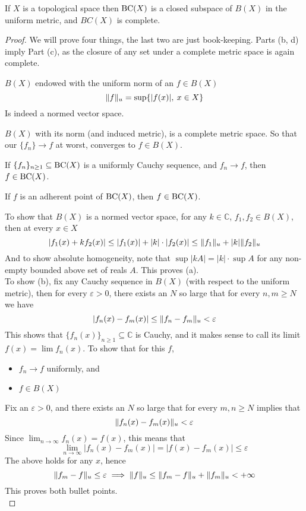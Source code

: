 \documentclass[../../main.tex]{subfiles}
\begin{document}
\begin{wts}
If $X$ is a topological space then $\operatorname{BC}({X})$ is a closed subspace of $B(X)$ in the uniform metric, and $BC(X)$ is complete.
\end{wts}
\begin{proof}
We will prove four things, the last two are just book-keeping. Parts (b, d) imply Part (c), as the closure of any set under a complete metric space is again complete.

\begin{enumalpha}
    \item $B(X)$ endowed with the uniform norm of an $f\in B(X)$
    \[
    \lVert {f} \rVert_u = \sup \{|f(x)|,\: x\in X\}
    \]
    Is indeed a normed vector space.
    
    \item $B(X)$ with its norm (and induced metric), is a complete metric space. So that our $\{f_n\}\to f$ at worst, converges to $f\in B(X)$.

    \item If $\{f_n\}_{n\geq 1}\subseteq \operatorname{BC}({X})$ is a uniformly Cauchy sequence, and $f_n\to f$, then $f\in \operatorname{BC}({X})$.
    \item If $f$ is an adherent point of $\operatorname{BC}({X})$, then $f\in \operatorname{BC}({X})$.
\end{enumalpha}
    To show that $B(X)$ is a normed vector space, for any $k\in \mathbb{C}$, $f_1, f_2\in B(X)$, then at every $x\in X$
    \[
    |f_1(x) + kf_2(x)|\leq |f_1(x)| + |k|\cdot|f_2(x)|\leq \lVert {f_1} \rVert_u + |k|\lVert {f_2} \rVert_u
    \]
    And to show absolute homogeneity, note that $\sup{|kA|} = |k|\cdot\sup{A}$ for any non-empty bounded above set of reals $A$. This proves (a).\\
    
    To show (b), fix any Cauchy sequence in $B(X)$ (with respect to the uniform metric), then for every $\varepsilon>0$, there exists an $N$ so large that for every $n,m\geq N$ we have
    \[
    |f_n(x)-f_m(x)|\leq \lVert {f_n-f_m} \rVert_u<\varepsilon
    \]
    This shows that $\{f_n(x)\}_{n\geq 1}\subseteq \mathbb{C}$ is Cauchy, and it makes sense to call its limit $f(x) = \lim f_n(x)$. To show that for this $f$,
    
    \begin{itemize}
        \item $f_n\to f$ uniformly, and
        \item $f\in B(X)$
    \end{itemize}

    Fix an $\varepsilon>0$, and there exists an $N$ so large that for every $m, n\geq N$ implies that
    \[
        \lVert {f_n(x)-f_m(x)} \rVert_u < \varepsilon
    \]
    Since $\lim_{n\to\infty}f_n(x) = f(x)$, this means that
    \[
        \lim_{n\to\infty}|f_n(x)-f_m(x)|=|f(x)-f_m(x)|\leq\varepsilon
    \]
    The above holds for any $x$, hence
    \[
        \lVert {f_m-f} \rVert_u\leq\varepsilon\implies \lVert {f} \rVert_u \leq \lVert {f_m - f} \rVert_u + \lVert {f_m} \rVert_u<+\infty
    \]
    This proves both bullet points.\\
    

\end{proof}
\end{document}
